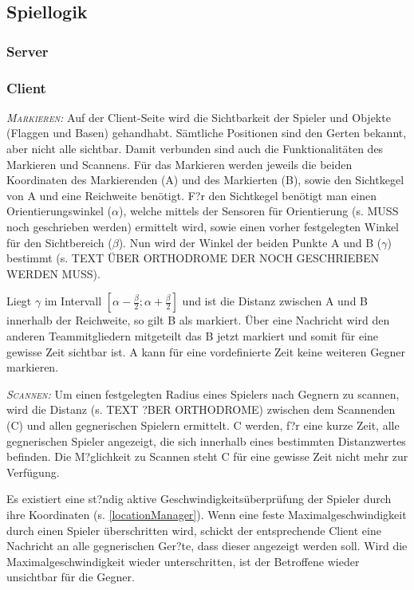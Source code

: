 \subsection{Spiellogik}

\subsubsection*{Server}


\subsubsection*{Client}
\textsc{\textit{Markieren: }}
Auf der Client-Seite wird die Sichtbarkeit der Spieler und Objekte (Flaggen und Basen) gehandhabt. Sämtliche Positionen sind den Gerten bekannt, aber nicht alle sichtbar. Damit verbunden sind auch die Funktionalitäten des Markieren und Scannens. Für das Markieren werden jeweils die beiden Koordinaten des Markierenden (A) und des Markierten (B), sowie den Sichtkegel von A und eine Reichweite benötigt. 
F?r den Sichtkegel benötigt man einen Orientierungswinkel ($\alpha$), welche mittels der Sensoren für Orientierung (s. MUSS noch geschrieben werden) ermittelt wird, sowie einen vorher festgelegten Winkel für den Sichtbereich ($\beta$). Nun wird der Winkel der beiden Punkte A und B ($\gamma$) bestimmt (s. TEXT ÜBER ORTHODROME DER NOCH GESCHRIEBEN WERDEN MUSS).

Liegt $\gamma$ im Intervall $[ \alpha - \frac{\beta}{2}; \alpha + \frac{\beta}{2}]$ und ist die Distanz zwischen A und B innerhalb der Reichweite, so gilt B als markiert. Über eine Nachricht wird den anderen Teammitgliedern mitgeteilt das B jetzt markiert und somit für eine gewisse Zeit sichtbar ist. A kann für eine vordefinierte Zeit keine weiteren Gegner markieren.

\textsc{\textit{Scannen: }}
Um einen festgelegten Radius eines Spielers nach Gegnern zu scannen, wird die Distanz (s. TEXT ?BER ORTHODROME) zwischen dem Scannenden (C) und allen gegnerischen Spielern ermittelt. C werden, f?r eine kurze Zeit, alle gegnerischen Spieler angezeigt, die sich innerhalb eines bestimmten Distanzwertes befinden. Die M?glichkeit zu Scannen steht C für eine gewisse Zeit nicht mehr zur Verfügung.

Es existiert eine st?ndig aktive Geschwindigkeitsüberprüfung der Spieler durch ihre Koordinaten (s. \ref{locationManager}). Wenn eine feste Maximalgeschwindigkeit durch einen Spieler überschritten wird, schickt der entsprechende Client eine Nachricht an alle gegnerischen Ger?te, dass dieser angezeigt werden soll. Wird die Maximalgeschwindigkeit wieder unterschritten, ist der Betroffene wieder unsichtbar für die Gegner.